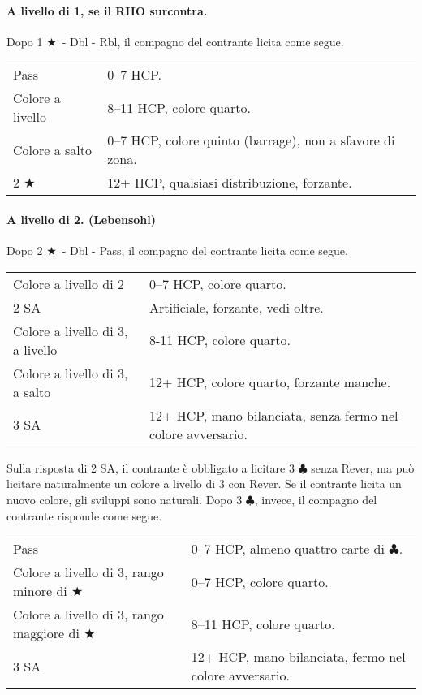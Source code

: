 \documentclass[a4paper,10pt]{article}
\renewcommand{\c}{$\clubsuit$\xspace}
\renewcommand{\j}{$\bigstar$\xspace}
\newcommand{\sa}{SA\xspace}
\newcommand{\smallspace}{\vskip0.3cm}
\newenvironment{twocol}
  {\smallspace\noindent\begin{tabular}{l p{0.78\textwidth}}}
  {\end{tabular}\smallspace}
\begin{document}
\paragraph{A livello di 1, se il RHO surcontra.} Dopo 1 \j\ - Dbl - Rbl, il compagno del contrante licita come segue.

\begin{twocol}
	Pass & 0--7 HCP. \\
	Colore a livello & 8--11 HCP, colore quarto. \\
	Colore a salto & 0--7 HCP, colore quinto (barrage), non a sfavore di zona. \\
	2 \j & 12+ HCP, qualsiasi distribuzione, forzante. \\
\end{twocol}

\paragraph{A livello di 2. (Lebensohl)} Dopo 2 \j\ - Dbl - Pass, il compagno del contrante licita come segue.


\begin{twocol}
	Colore a livello di 2 & 0--7 HCP, colore quarto. \\
	2 \sa & Artificiale, forzante, vedi oltre. \\
	Colore a livello di 3, a livello & 8-11 HCP, colore quarto. \\
	Colore a livello di 3, a salto & 12+ HCP, colore quarto, forzante manche. \\
	3 \sa & 12+ HCP, mano bilanciata, senza fermo nel colore avversario.
\end{twocol}

Sulla risposta di 2 \sa, il contrante è obbligato a licitare 3 \c senza Rever, ma può licitare naturalmente un colore a livello di 3 con Rever. Se il contrante licita un nuovo colore, gli sviluppi sono naturali. Dopo 3 \c, invece, il compagno del contrante risponde come segue.

\begin{twocol}
	Pass & 0--7 HCP, almeno quattro carte di \c. \\
	Colore a livello di 3, rango minore di \j & 0--7 HCP, colore quarto. \\
	Colore a livello di 3, rango maggiore di \j & 8--11 HCP, colore quarto. \\
	3 \sa & 12+ HCP, mano bilanciata, fermo nel colore avversario.
\end{twocol}
\end{document}
